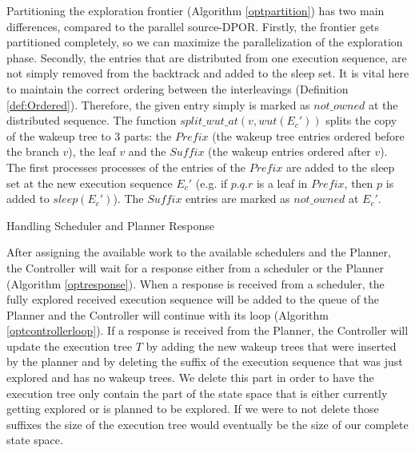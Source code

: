 Partitioning the exploration frontier (Algorithm \ref{optpartition}) has two main differences, compared to the parallel source-DPOR.
Firstly, the frontier gets partitioned completely, so we can maximize the parallelization of the exploration phase. 
Secondly, the entries that are distributed from one execution sequence, are not simply removed from the backtrack and added to
the sleep set. It is vital here to maintain the correct ordering between the interleavings (Definition \ref{def:Ordered}). Therefore,
the given entry simply is marked as $not\_owned$ at the distributed sequence. The function  $split\_wut\_at(v, wut(E_c'))$
splits the copy of the wakeup tree to 3 parts: the $Prefix$ (the wakeup tree entries ordered before the branch $v$), the leaf $v$
and the $Suffix$ (the wakeup entries ordered after $v$). The first processes processes of the entries of
the $Prefix$ are added to the sleep set at the new execution sequence $E_c'$ (e.g. if $p.q.r$ is a leaf in $Prefix$, then $p$ is added to
$sleep(E_c')$). The $Suffix$ entries are marked as $not\_owned$ at $E_c'$.

\begin{algorithm}
    \caption{Handling Scheduler and Planner Response}
    \label{optresponse}
\end{algorithm}

After assigning the available work to the available schedulers and the Planner, the Controller will wait for a response
either from a scheduler or the Planner (Algorithm \ref{optresponse}). When a response is received from a scheduler,
the fully explored received execution sequence will be added to the queue of the Planner and the Controller will continue
with its loop (Algorithm \ref{optcontrollerloop}). If a response is received from the Planner, the Controller will update
the execution tree $T$ by adding the new wakeup trees that were inserted by the planner and by deleting the suffix of
the execution sequence that was just explored and has no wakeup trees. We delete this part in order to have the 
execution tree only contain the part of the state space that is either currently getting explored or is planned to be explored.
If we were to not delete those suffixes the size of the execution tree would eventually be the size of our complete state space.

